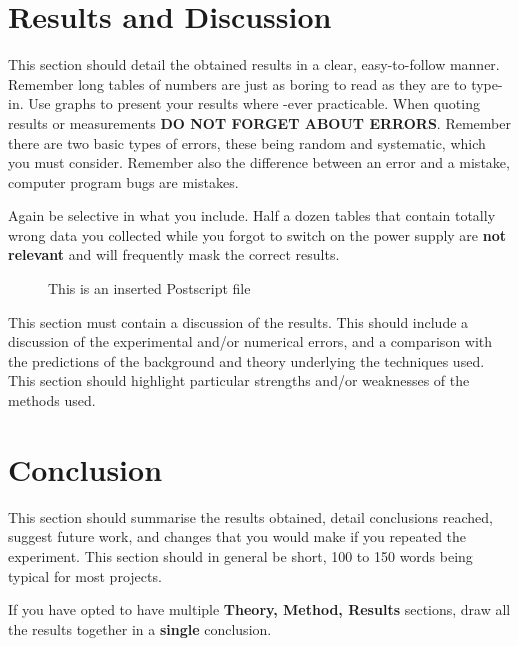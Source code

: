 \documentclass[a4paper,12pt]{article}
\begin{document}
\pagebreak
\section{Results and Discussion}

This section should detail the obtained results in a clear,
easy-to-follow manner. Remember long tables of numbers are just as boring to
read as they are to type-in. Use graphs to present your results where
-ever practicable. When quoting results or measurements
{\bf DO NOT FORGET ABOUT ERRORS}. Remember there are two basic types
of errors, these being random and systematic, which you must consider.
Remember also the difference between an error and a mistake, computer
program bugs are mistakes.

 
Again be selective in what you include. Half a dozen
tables that contain totally wrong data you collected while you forgot
to switch on the power supply are {\bf not relevant} and will frequently
mask the correct results. 
%
%
\begin{figure}[htb]     %
        \begin{center}
                \leavevmode             %
                \epsfxsize=90mm         %
\end{center}
\caption{This is an inserted Postscript file}
\end{figure}

This section must contain a discussion of the results. This should
include a discussion of the experimental and/or numerical errors, and a
comparison with the predictions of the background and theory underlying
the techniques used. This section should highlight particular strengths
and/or weaknesses of the methods used.

 
\section{Conclusion}
This section should summarise the results obtained, detail
conclusions reached, suggest future work, and changes that you would make if you repeated the
experiment. This section should in general be short, 100 to 150 words
being typical for most projects.
\par\noindent
If you have opted to have multiple {\bf Theory, Method, Results}
sections, draw all the results together in a {\bf single} conclusion.
\end{document}
